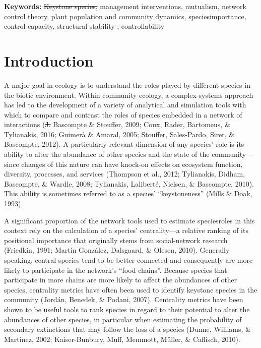 \documentclass[a4paper]{artikel1}
\theoremstyle{definition}
\theoremstyle{definition}
\theoremstyle{definition}
\theoremstyle{remark}
\providecommand{\DIFaddtex}[1]{{\protect\color{blue}\uwave{#1}}} %
\providecommand{\DIFdeltex}[1]{{\protect\color{red}\sout{#1}}}                      %
\providecommand{\DIFaddbegin}{} %
\providecommand{\DIFaddend}{} %
\providecommand{\DIFdelbegin}{} %
\providecommand{\DIFdelend}{} %
\providecommand{\DIFadd}[1]{\texorpdfstring{\DIFaddtex{#1}}{#1}} %
\providecommand{\DIFdel}[1]{\texorpdfstring{\DIFdeltex{#1}}{}} %
\begin{document}
\textbf{Keywords:} \DIFdelbegin \DIFdel{Keystone species, }\DIFdelend \DIFaddbegin \DIFadd{Invasive species, keystone species, }\DIFaddend management
interventions, mutualism, network control theory, plant population and
community dynamics, species\DIFaddbegin \DIFadd{' }\DIFaddend importance, control capacity, structural
stability
\DIFdelbegin \DIFdel{,
controllability
}\DIFdelend 

\clearpage

\section{Introduction}\label{introduction}

A major goal in ecology is to understand the roles played by different
species in the biotic environment. Within community ecology, a
complex-systems approach has led to the development of a variety of
analytical and simulation tools with which to compare and contrast the
roles of species embedded in a network of interactions (\DIFdelbegin \DIFdel{J. }\DIFdelend Bascompte \&
Stouffer, 2009; Coux, Rader, Bartomeus, \& Tylianakis, 2016; Guimerà \&
Amaral, 2005; Stouffer, Sales-Pardo, Sirer, \& Bascompte, 2012). A
particularly relevant dimension of any species' role is its ability to
alter the abundance of other species and the state of the
community---since changes of this nature can have knock-on effects on
ecosystem function, diversity, processes, and services (Thompson et al.,
2012; Tylianakis, Didham, Bascompte, \& Wardle, 2008; Tylianakis,
Laliberté, Nielsen, \& Bascompte, 2010). This ability is sometimes
referred to as a species' ``keystoneness'' (Mills \& Doak, 1993).

A significant proportion of the network tools used to estimate species\DIFaddbegin \DIFadd{'
}\DIFaddend roles in this context rely on the calculation of a species'
centrality---a relative ranking of its positional importance that
originally stems from social-network research (Friedkin, 1991; Martín
González, Dalsgaard, \& Olesen, 2010). Generally speaking, central
species tend to be better connected and consequently are more likely to
participate in the network's ``food chains''. Because species that
participate in more chains are more likely to affect the abundances of
other species, centrality metrics have often been used to identify
keystone species in the community (Jordán, Benedek, \& Podani, 2007).
Centrality metrics have been shown to be useful tools to rank species in
regard to their potential to alter the abundances of other species, in
particular when estimating the probability of secondary extinctions that
may follow the loss of a species (Dunne, Williams, \& Martinez, 2002;
Kaiser-Bunbury, Muff, Memmott, Müller, \& Caflisch, 2010).
\end{document}
